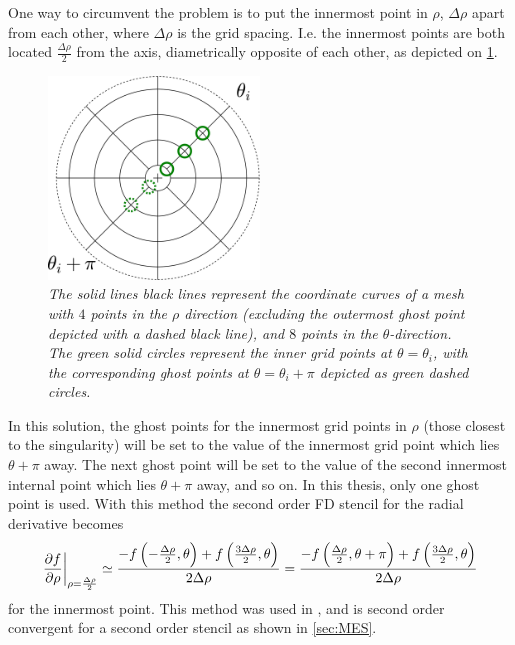 One way to circumvent the problem is to put the innermost point in $\rho$, $\Delta \rho$ apart from each other, where $\Delta \rho$ is the grid spacing.
I.e. the innermost points are both located $\frac{\Delta \rho}{2}$ from the axis, diametrically opposite of each other, as depicted on \cref{fig:innerRho}.
%
\begin{figure}[htb]
    \centering
    \includegraphics[width=0.5\textwidth]{fig/innerGhost}
    \caption{\textit{
The solid lines black lines represent the coordinate curves of a mesh with $4$ points in the $\rho$ direction (excluding the outermost ghost point depicted with a dashed black line), and $8$ points in the $\theta$-direction.
The green solid circles represent the inner grid points at $\theta=\theta_i$, with the corresponding ghost points at $\theta=\theta_i + \pi$ depicted as green dashed circles.
    }}
    \label{fig:innerRho}
\end{figure}
%
In this solution, the ghost points for the innermost grid points in $\rho$ (those closest to the singularity) will be set to the value of the innermost grid point which lies $\theta + \pi$ away.
The next ghost point will be set to the value of the second innermost internal point which lies $\theta + \pi$ away, and so on.
In this thesis, only one ghost point is used.
With this method the second order FD stencil for the radial derivative becomes
%
\begin{align*}
    \left.\frac{\partial {f}}{\partial{\rho}}\right|_{\rho=\frac{\Delta \rho}{2}} \simeq
    \frac{-f\left(-\frac{\Delta \rho}{2}, \theta\right) + f\left(\frac{3\Delta \rho}{2}, \theta\right)}{2\Delta \rho}
    =
    \frac{-f\left(\frac{\Delta \rho}{2}, \theta+\pi\right) + f\left(\frac{3\Delta \rho}{2}, \theta\right)}{2\Delta \rho}
\end{align*}
%
for the innermost point.
This method was used in \cite{Naulin2008}, and is second order convergent for a second order stencil as shown in \cref{sec:MES}.

